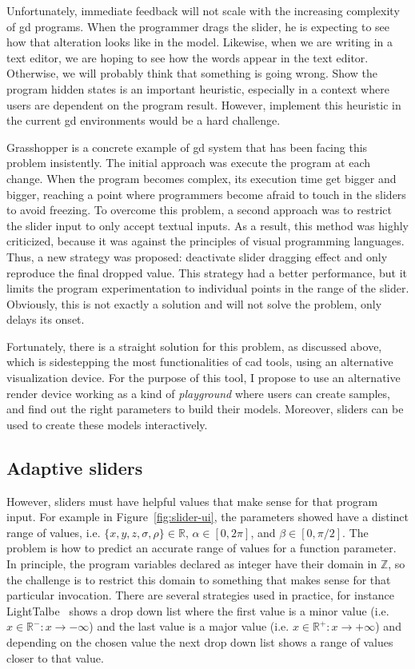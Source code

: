 Unfortunately, immediate feedback will not scale with the increasing complexity of \gls{gd} programs. When the programmer drags the slider, he is expecting to see how that alteration looks like in the model. Likewise, when we are writing in a text editor, we are hoping to see how the words appear in the text editor. Otherwise, we will probably think that something is going wrong. Show the program hidden states is an important heuristic, especially in a context where users are dependent on the program result. However, implement this heuristic in the current \gls{gd} environments would be a hard challenge.

Grasshopper is a concrete example of \gls{gd} system that has been facing this problem insistently. The initial approach was execute the program at each change. When the program becomes complex, its execution time get bigger and bigger, reaching a point where programmers become afraid to touch in the sliders to avoid freezing. To overcome this problem, a second approach was to restrict the slider input to only accept textual inputs. As a result, this method was highly criticized, because it was against the principles of visual programming languages. Thus, a new strategy was proposed: deactivate slider dragging effect and only reproduce the final dropped value. This strategy had a better performance, but it limits the program experimentation to individual points in the range of the slider. Obviously, this is not exactly a solution and will not solve the problem, only delays its onset.

Fortunately, there is a straight solution for this problem, as discussed above, which is sidestepping the most functionalities of \gls{cad} tools, using an alternative visualization device. For the purpose of this tool, I propose to use an alternative render device working as a kind of \textit{playground} where users can create samples, and find out the right parameters to build their models. Moreover, sliders can be used to create these models interactively.

\subsection{Adaptive sliders}

However, sliders must have helpful values that make sense for that program input. For example in Figure~\ref{fig:slider-ui}, the parameters showed have a distinct range of values, i.e. $\{x,y,z,\sigma,\rho\} \in \mathds{R}$, $\alpha \in [0, 2 \pi]$, and $\beta \in [0, \pi/2 ]$. The problem is how to predict an accurate range of values for a function parameter. In principle, the program variables declared as integer have their domain in $\mathds{Z}$, so the challenge is to restrict this domain to something that makes sense for that particular invocation. There are several strategies used in practice, for instance LightTalbe~\citep{lighttable} shows a drop down list where the first value is a minor value (i.e. $x \in \mathds{R}^- : x \rightarrow - \infty$) and the last value is a major value (i.e. $x \in \mathds{R}^+ : x \rightarrow + \infty$) and depending on the chosen value the next drop down list shows a range of values closer to that value.

